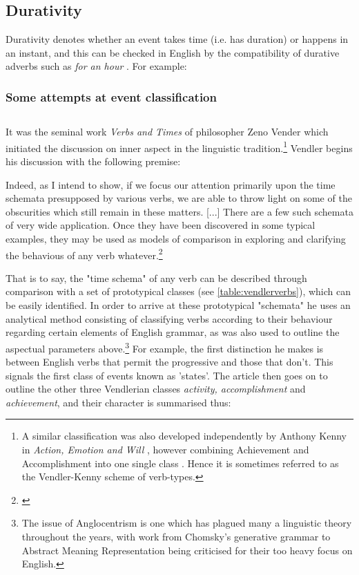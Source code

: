 \subsection*{Durativity}
Durativity denotes whether an event takes time (i.e. has duration) or happens in an instant, and this can be checked in English by the compatibility of durative adverbs such as \emph{for an hour} \citep{102998}. For example:
\begin{exe}
\end{exe}
\subsubsection{Some attempts at event classification}
\subsection*{\citet{vendler57}}
It was the seminal work \emph{Verbs and Times} \citep{vendler57} of philosopher Zeno Vender which initiated the discussion on inner aspect in the linguistic tradition.\footnote{A similar classification was also developed independently by Anthony Kenny in \emph{Action, Emotion and Will} \citep{Kenny1963-KENAEA}, however combining Achievement and Accomplishment into one single class \citep{19c36731-bdec-362e-9f45-1aaba76109d7}. Hence it is sometimes referred to as the Vendler-Kenny scheme of verb-types.} Vendler begins his discussion with the following premise:

\begin{displayquote}
    Indeed, as I intend to show, if we focus our attention primarily upon the time schemata presupposed by various verbs, we are able to throw light on some of the obscurities which still remain in these matters. [...] There are a few such schemata of very wide application. Once they have been discovered in some typical examples, they may be used as models of comparison in exploring and clarifying the behavious of any verb whatever.\footnote{\citet{vendler57}}
\end{displayquote}
That is to say, the "time schema" of any verb can be described through comparison with a set of prototypical classes (see \ref{table:vendlerverbs}), which can be easily identified. In order to arrive at these prototypical "schemata" he uses an analytical method consisting of classifying verbs according to their behaviour regarding certain elements of English grammar, as was also used to outline the aspectual parameters above.\footnote{The issue of Anglocentrism is one which has plagued many a linguistic theory throughout the years, with work from Chomsky's generative grammar \citep{LEVISEN2019101173} to Abstract Meaning Representation \citep{damonte2018crosslingual} being criticised for their too heavy focus on English.} For example, the first distinction he makes is between English verbs that permit the progressive and those that don't. This signals the first class of events known as 'states'. The article then goes on to outline the other three Vendlerian classes \emph{activity, accomplishment} and \emph{achievement}, and their character is summarised thus: 

